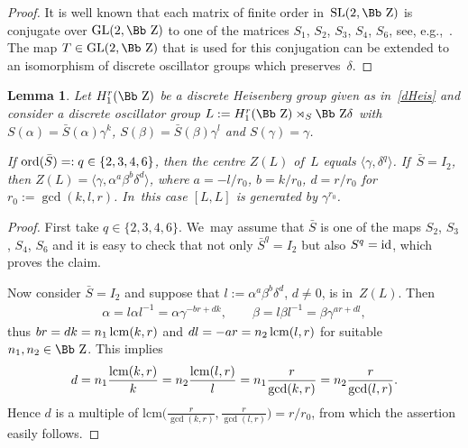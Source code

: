 \documentclass[10pt,a4paper]{amsart}
\newcommand\ZZ{{\mbox{\Bb Z}}}
\newcommand{\GL}{\mathop{{\rm GL}}}
\newcommand{\SL}{\mathop{{\rm SL}}}
\newcommand{\Id}{\mathop{{\rm id}}}
\newcommand{\lcm}{\mathop{{\rm lcm}}}
\newcommand{\ord}{{\rm ord}}
\newcommand\la{\langle}
\newcommand\ra{\rangle}
\numberwithin{equation}{section}
\newtheorem{Lemma}[Theorem]{Lemma}
\begin{document}
\begin{proof}
It is well known that each matrix of finite order in~$\SL(2,\ZZ)$ is conjugate over $\GL(2,\ZZ)$ to one of the matrices $S_1$, $S_2$, $S_3$, $S_4$, $S_6$, see, e.g.,~\cite{N}. The map $T\in\GL(2,\ZZ)$ that is used for this conjugation can be extended to an isomorphism of discrete oscillator groups which preserves~$\delta$.
\end{proof}
%
\begin{Lemma}
Let $H_1^r(\ZZ)$ be a discrete Heisenberg group given as in~\eqref{dHeis} and consider a discrete oscillator group $L:=H_1^r(\ZZ)\rtimes_S \ZZ \delta$ with $S(\alpha)=\bar S(\alpha)\gamma^k$, $S(\beta)=\bar S(\beta)\gamma^l$ and $S(\gamma)=\gamma$.

If $\ord(\bar S)=:q\in\{2,3,4,6\}$, then the centre $Z(L)$ of~$L$ equals $\la \gamma, \delta^q\ra$. If~$\bar S=I_2$, then $Z(L)=\la \gamma, \alpha^a\beta^b\delta^d\ra$,
where $a=-l/r_0$, $b=k/r_0$, $d=r/r_0$ for $r_0:=\gcd(k,l,r)$. In~this case $[L,L]$ is generated by $\gamma^{r_0}$.
\end{Lemma}

\begin{proof}
First take $q\in\{2,3,4,6\}$. We~may assume that $\bar S$ is one of the maps $S_2$, $S_3$, $S_4$, $S_6$ and it is easy to check that not only $\bar S^q=I_2$ but also $S^q=\Id$, which proves the claim.

Now consider $\bar S=I_2$ and suppose that $l:=\alpha^a\beta^b\delta^d$, $d\not=0$, is in~$Z(L)$. Then
\begin{gather*}
\alpha=l\alpha l^{-1}=\alpha \gamma^{-br+dk}, \qquad
\beta=l\beta l^{-1}=\beta\gamma^{ar+dl},
\end{gather*}
thus $br=dk=n_1 \lcm(k,r)$ and $dl=-ar=n_2 \lcm(l,r)$ for suitable $n_1,n_2\in\ZZ$. This implies
\begin{gather*}
d= n_1\frac{\lcm(k,r)}k=n_2\frac{\lcm(l,r)}l
 = n_1 \frac r{\gcd(k,r)}= n_2\frac r{\gcd(l,r)}.
\end{gather*}
Hence $d$ is a multiple of lcm$\big( \frac r{\gcd(k,r)},\frac r{\gcd(l,r)}\big)=r/{r_0}$, from which the assertion easily follows.
\end{proof}
\end{document}
